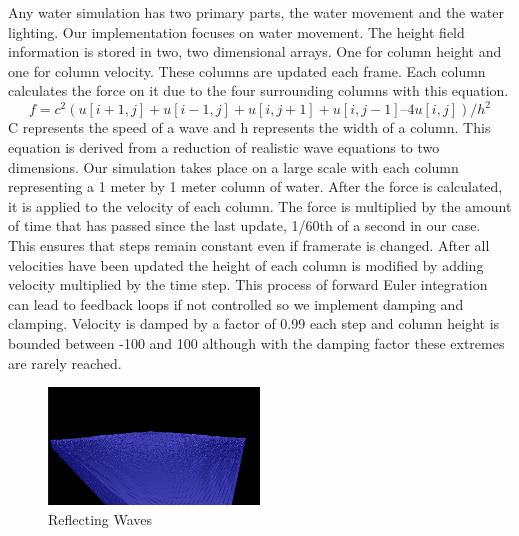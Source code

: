 \documentclass[11pt]{article}
\begin{document}
Any water simulation has two primary parts, the water movement and the water 
lighting.  Our implementation focuses on water movement.  The height field 
information is stored in two, two dimensional arrays.  One for column height 
and one for column velocity.  These columns are updated each frame.  Each 
column calculates the force on it due to the four surrounding columns with this 
equation. \[ f = c^2 ( u[i+1,j] + u[i-1,j] + u[i,j+1] + u[i,j-1] – 4 u[i,j] 
)/h^2 \]  C 
represents the speed of a wave and h represents the width of a column.  This 
equation is derived from a reduction of realistic wave equations to two 
dimensions.  Our simulation takes place on a large scale with each column 
representing a 1 meter by 1 meter column of water.  After the force is 
calculated, it is applied to the velocity of each column.  The force is 
multiplied by the amount of time that has passed since the last update, 1/60th 
of a second in our case.  This ensures that steps remain constant even if 
framerate is changed.  After all velocities have been updated the height of 
each column is modified by adding velocity multiplied by the time step.  This 
process of forward Euler integration can lead to feedback loops if not 
controlled so we implement damping and clamping.  Velocity is damped by a 
factor of 0.99 each step and column height is bounded between -100 and 100 
although with the damping factor these extremes are rarely reached.

\begin{figure}[H]
    \caption{Reflecting Waves}
    \label{fig:reflection}
    \centering
    \includegraphics[width=0.5\textwidth]{../www/images/bouncingWaves}
\end{figure}
	
\end{document}
